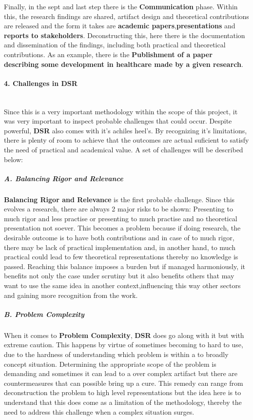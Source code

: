 Finally, in the sept and last step there is the \textbf{Communication} phase. Within this, the research findings are shared, artifact design and theoretical contributions are released and the form it takes are \textbf{academic papers},\textbf{presentations} and \textbf{reports to stakeholders}. Deconstructing this, here there is the documentation and dissemination of the findings, including both practical and theoretical contributions. As an example, there is the \textbf{Publishment of a paper describing some development in healthcare made by a given research}.

\paragraph{4. Challenges in DSR}\mbox{}\\
Since this is a very important methodology within the scope of this project, it was very important to inspect probable challenges that could occur.
Despite powerful, \textbf{DSR} also comes with it's achiles heel's. By recognizing it's limitations, there is plenty of room to achieve that the outcomes are actual suficient to satisfy the need of practical and academical value. A set of challenges will be described below:
\subparagraph{A. Balancing Rigor and Relevance}\mbox{}

\textbf{Balancing Rigor and Relevance} is the first probable challenge. Since this evolves a research, there are always 2 major risks to be shown: Presenting to much rigor and less practise or presenting to much practise and no theoretical presentation not soever. This becomes a problem because if doing research, the desirable outcome is to have both contributions and in case of to much rigor, there may be lack of practical implementation and, in another hand, to much practical could lead to few theoretical representations thereby no knowledge is passed. Reaching this balance imposes a burden but if managed harmoniously, it benefits not only the case under scrutiny but it also benefits others that may want to use the same idea in another context,influencing this way other sectors and gaining more recognition from the work.
\subparagraph{B. Problem Complexity} \mbox{}

When it comes to \textbf{Problem Complexity}, \textbf{DSR} does go along with it but with extreme caution. This happens by virtue of sometimes becoming to hard to use, due to the hardness of understanding which problem is within a to broadly concept situation. Determining the appropriate scope of the problem is demanding and sometimes it can lead to a over complex artifact but there are countermeasures that can possible bring up a cure. This remedy can range from deconstruction the problem to high level representations but the idea here is to understand that this does come as a limitation of the methodology, thereby the need to address this challenge when a complex situation surges.

